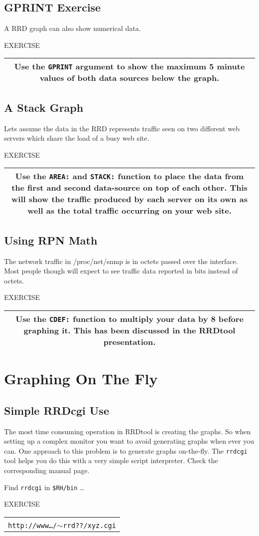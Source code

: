 \documentclass[a4paper,12pt]{article}
\newenvironment{work}{\textsf{\tiny EXERCISE}\nopagebreak\\[0.3ex]\begin{tabular}{|c|}
 \hline
 \begin{minipage}{0.965\linewidth}%
 \setlength{\parskip}{1.6ex plus 0.6ex minus 0.4ex}%
 \rule{0pt}{2.8ex}\ignorespaces}
{\rule[-1.8ex]{0pt}{0pt}\end{minipage}\\
 \hline
 \end{tabular}}
\newcommand{\ex}[1]{\subsection{#1}}
\newcommand{\cmd}[1]{\texttt{\mbox{#1}}}
\newcommand\ti{$\sim$}   %
\begin{document}
\ex{GPRINT Exercise}
A RRD graph can also show numerical data.

\begin{work}
  Use the \cmd{GPRINT} argument to show the maximum 5 minute values of
  both data sources below the graph.
\end{work}

\ex{A Stack Graph}
Lets assume the data in the RRD represents traffic seen on two
different web servers which share the load of a busy web site.

\begin{work}
  Use the \cmd{AREA:} and \cmd{STACK:} function to place the data from
  the first and second data-source on top of each other. This will
  show the traffic produced by each server on its own as well as the
  total traffic occurring on your web site.
\end{work}

\ex{Using RPN Math}

The network traffic in /proc/net/snmp is in octets passed over the
interface. Most people though will expect to see traffic data reported in
bits instead of octets.

\begin{work}
Use the \cmd{CDEF:} function to multiply your data by 8
before graphing it. This has been discussed in the RRDtool
presentation.
\end{work}

\newpage
\section{Graphing On The Fly}
\ex{Simple RRDcgi Use} 

The most time consuming operation in RRDtool is creating the graphs.
So when setting up a complex monitor you want to avoid generating
graphs when ever you can. One approach to this problem is to generate
graphs on-the-fly. The \cmd{rrdcgi} tool helps you do this with a very
simple script interpreter. Check the corresponding manual page.

Find \cmd{rrdcgi} in \cmd{\$RH/bin} \ldots

\begin{work}
  Write a \cmd{rrdcgi} input file which generates the stacked graph
  you did in the last example. Check the effect of the \texttt{--lazy}
  option. You can test your input file by putting it into 
  \cmd{public\_html/xyz.cgi} and then calling\\
  \cmd{http://www\ldots/\ti rrd??/xyz.cgi}
\end{work}
\end{document}
